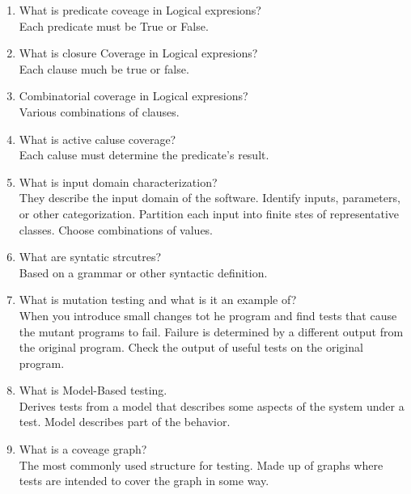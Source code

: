 \documentclass[10pt]{article}
\begin{document}
\begin{enumerate}
      \item What is predicate coveage in Logical expresions?\\
            Each predicate must be True or False.\\

      \item What is closure Coverage in Logical expresions?\\
            Each clause much be true or false.\\

      \item Combinatorial coverage in Logical expresions?\\
            Various combinations of clauses.\\

      \item What is active caluse coverage?\\
            Each caluse must determine the predicate's result.\\

      \item What is input domain characterization?\\
            They describe the input domain of the software. Identify inputs, parameters, or other categorization. Partition each input into finite stes of representative classes. Choose combinations of values.\\

      \item What are syntatic strcutres?\\
            Based on a grammar or other syntactic definition.

      \item What is mutation testing and what is it an example of?\\
            When you introduce small changes tot he program and find tests that cause the mutant programs to fail. Failure is determined by a different output from the original program. Check the output of useful tests on the original program.\\

      \item What is Model-Based testing.\\
            Derives tests from a model that describes some aspects of the system under a test. Model describes part of the behavior.\\

      \item What is a coveage graph?\\
            The most commonly used structure for testing. Made up of graphs where tests are intended to cover the graph in some way.\\


\end{enumerate}
\end{document}
